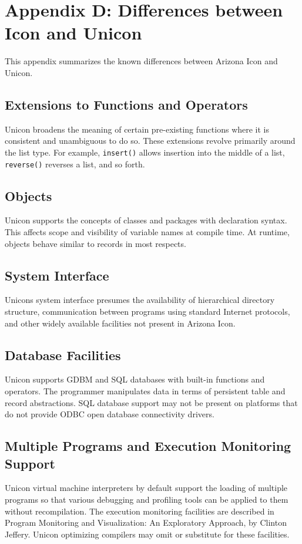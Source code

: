 \clearpage\section{Appendix D: Differences between Icon and Unicon}

This appendix summarizes the known differences between Arizona Icon and
Unicon.

\subsection{Extensions to Functions and Operators}
Unicon broadens the meaning of certain pre-existing functions where it
is consistent and unambiguous to do so. These extensions revolve
primarily around the list type. For example,
\texttt{insert()} allows insertion into the middle of a
list, \texttt{reverse()} reverses a list, and so forth.

\subsection{Objects}
Unicon supports the concepts of classes and packages with declaration
syntax. This affects scope and visibility of variable names at compile
time. At runtime, objects behave similar to records in most respects.

\subsection{System Interface}
Unicon{\textquotesingle}s system interface presumes the availability of
hierarchical directory structure, communication between programs using
standard Internet protocols, and other widely available facilities not
present in Arizona Icon.

\subsection{Database Facilities}
Unicon supports GDBM and SQL databases with
built-in functions and operators. The programmer manipulates data in
terms of persistent table and record abstractions. SQL database support
may not be present on platforms that do not provide ODBC
open database connectivity drivers.

\subsection{Multiple Programs and Execution Monitoring Support}
Unicon virtual machine interpreters by default support the loading of
multiple programs so that various debugging and profiling tools can be
applied to them without recompilation. The execution monitoring
facilities are described in {\textquotedbl}Program Monitoring and
Visualization: An Exploratory Approach{\textquotedbl}, by Clinton
Jeffery. Unicon optimizing compilers may omit or substitute for these
facilities.

\clearpage
\bigskip

